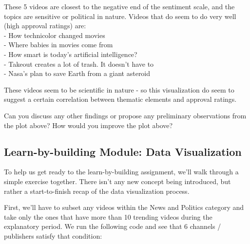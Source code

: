 \documentclass[]{article}
\newenvironment{Shaded}{\begin{snugshade}}{\end{snugshade}}
\newcommand{\DataTypeTok}[1]{\textcolor[rgb]{0.13,0.29,0.53}{#1}}
\newcommand{\DecValTok}[1]{\textcolor[rgb]{0.00,0.00,0.81}{#1}}
\newcommand{\KeywordTok}[1]{\textcolor[rgb]{0.13,0.29,0.53}{\textbf{#1}}}
\newcommand{\NormalTok}[1]{#1}
\newcommand{\OperatorTok}[1]{\textcolor[rgb]{0.81,0.36,0.00}{\textbf{#1}}}
\newcommand{\StringTok}[1]{\textcolor[rgb]{0.31,0.60,0.02}{#1}}
\begin{document}
These 5 videos are closest to the negative end of the sentiment scale,
and the topics are sensitive or political in nature. Videos that do seem
to do very well (high approval ratings) are:\\
- How technicolor changed movies\\
- Where babies in movies come from\\
- How smart is today's artificial intelligence?\\
- Takeout creates a lot of trash. It doesn't have to\\
- Nasa's plan to save Earth from a giant asteroid

These videos seem to be scientific in nature - so this visualization do
seem to suggest a certain correlation between thematic elements and
approval ratings.

Can you discuss any other findings or propose any preliminary
observations from the plot above? How would you improve the plot above?

\hypertarget{learn-by-building-module-data-visualization}{%
\subsection{Learn-by-building Module: Data
Visualization}\label{learn-by-building-module-data-visualization}}

To help us get ready to the learn-by-building assignment, we'll walk
through a simple exercise together. There isn't any new concept being
introduced, but rather a start-to-finish recap of the data visualization
process.

First, we'll have to subset any videos within the News and Politics
category and take only the ones that have more than 10 trending videos
during the explanatory period. We run the following code and see that 6
channels / publishers satisfy that condition:

\begin{Shaded}
\end{Shaded}
\end{document}
